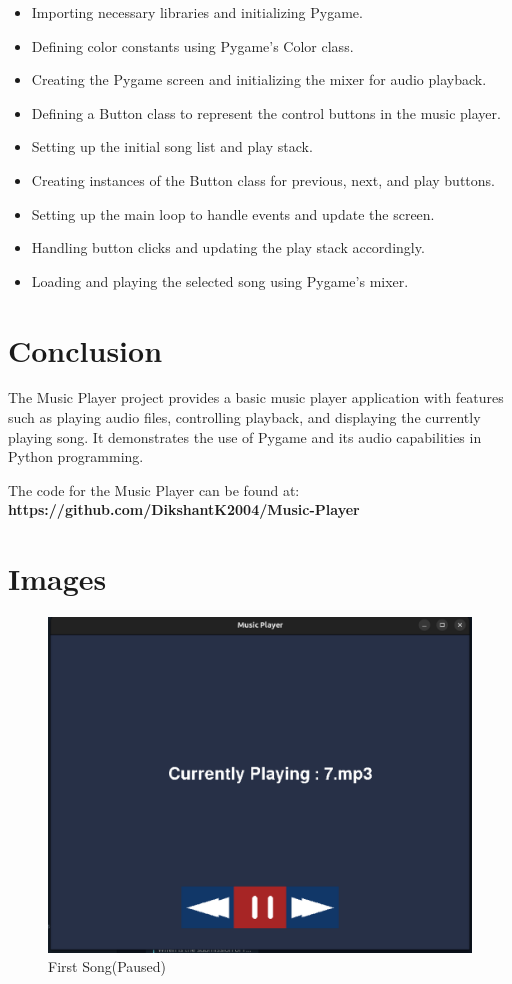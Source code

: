 \documentclass[journal,12pt,twocolumn]{IEEEtran}
\begin{document}
\begin{itemize}
\item Importing necessary libraries and initializing Pygame.
\item Defining color constants using Pygame's Color class.
\item Creating the Pygame screen and initializing the mixer for audio playback.
\item Defining a Button class to represent the control buttons in the music player.
\item Setting up the initial song list and play stack.
\item Creating instances of the Button class for previous, next, and play buttons.
\item Setting up the main loop to handle events and update the screen.
\item Handling button clicks and updating the play stack accordingly.
\item Loading and playing the selected song using Pygame's mixer.
\end{itemize}

\section{Conclusion}
The Music Player project provides a basic music player application with features such as playing audio files, controlling playback, and displaying the currently playing song. It demonstrates the use of Pygame and its audio capabilities in Python programming.

The code for the Music Player can be found at:
\textbf{https://github.com/DikshantK2004/Music-Player}
\section{Images}
\begin{figure}[h!]
        \includegraphics[scale = 0.25]{figs/img1}
        \caption{First Song(Paused)}
        \label{fig:1}
\end{figure}
\end{document}
